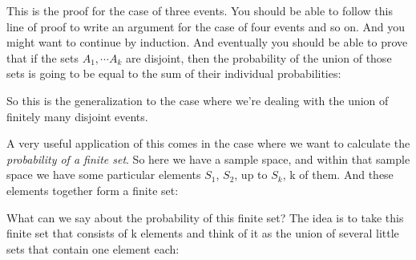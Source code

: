 \documentclass[pdftex, brazil, 12pt, twoside]{article}
\begin{document}
This is the proof for the case of three events.
You should be able to follow this line of proof to write an
argument for the case of four events and so on.
And you might want to continue by induction.
And eventually you should be able to prove that if the sets
$A_1,\cdots A_k$ are disjoint, then the probability of the union
of those sets is going to be equal to the sum of their
individual probabilities:

\begin{figure}[H]
  \begin{center}
  \end{center}
\end{figure}

So this is the generalization to the case where we're
dealing with the union of finitely many disjoint events.

A very useful application of this comes in the case where
we want to calculate the \emph{probability of a finite set}.
So here we have a sample space, and within that sample space we have some particular
elements $S_1$, $S_2$, up to $S_k$, k of them.
And these elements together form a finite set:

\begin{figure}[H]
  \begin{center}
  \end{center}
\end{figure}

What can we say about the probability
of this finite set?
The idea is to take this finite set that consists of k
elements and think of it as the union of several little
sets that contain one element each:

\begin{figure}[H]
  \begin{center}
  \end{center}
\end{figure}
\end{document}
